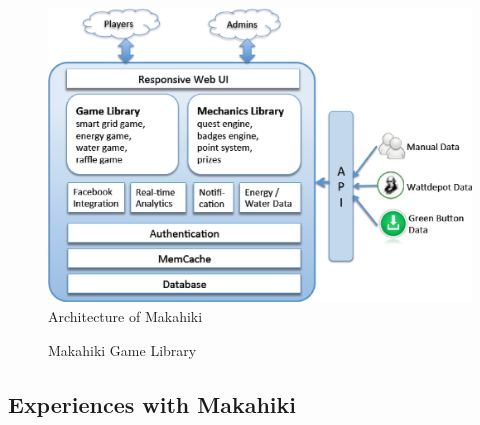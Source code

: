 \documentclass{sigchi}
\begin{document}
\begin{figure}[ht!]
  \center
  \includegraphics[width=\columnwidth]{makahiki-system-architecture}
  \caption{Architecture of Makahiki}
  \label{fig:makahiki-architecture}
\end{figure}

\begin{figure}[ht!]
	\center
		\caption{Makahiki Game Library}
		\label{fig:makahiki-games}
\end{figure}

\subsection{Experiences with Makahiki}
\end{document}
